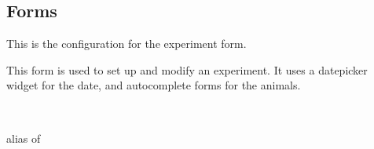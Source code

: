 \documentclass[letterpaper,10pt,english]{sphinxmanual}
\begin{document}
\subsection{Forms}
\label{api:forms}\label{api:module-data.forms}

\begin{fulllineitems}
\label{api:data.forms.ExperimentForm}
This is the configuration for the experiment form.

This form is used to set up and modify an experiment.  It uses a datepicker widget for the date, and autocomplete forms for the animals.

\begin{fulllineitems}
\label{api:data.forms.ExperimentForm.Media}
\end{fulllineitems}


\begin{fulllineitems}
\label{api:data.forms.ExperimentForm.Meta}~

\begin{fulllineitems}
\label{api:data.forms.ExperimentForm.Meta.model}
alias of 

\end{fulllineitems}


\end{fulllineitems}


\begin{fulllineitems}
\label{api:data.forms.ExperimentForm.media}
\end{fulllineitems}


\end{fulllineitems}
\end{document}
